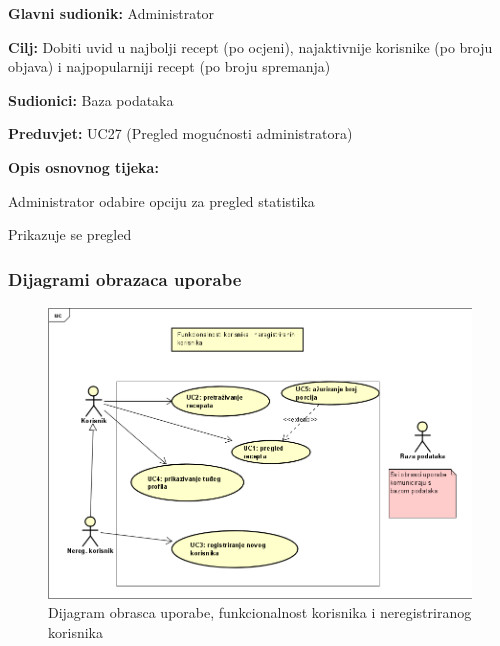 					\noindent {}
					\begin{packed_item}
						
						\item \textbf{Glavni sudionik: }Administrator
						\item \textbf{Cilj: }Dobiti uvid u najbolji recept (po ocjeni), najaktivnije korisnike (po broju objava) i najpopularniji recept (po broju spremanja)
						\item \textbf{Sudionici: }Baza podataka
						\item \textbf{Preduvjet: }UC27 (Pregled mogućnosti administratora)
						\item \textbf{Opis osnovnog tijeka:}
						
						\item[] \begin{packed_enum}
							\item Administrator odabire opciju za pregled statistika
							\item Prikazuje se pregled
						\end{packed_enum}
					\end{packed_item}
				
					
				\subsubsection{Dijagrami obrazaca uporabe}
					
					\begin{figure}[H]
						\includegraphics[scale=1]{slike/UC_nereg.png} %
						\centering
						\caption{Dijagram obrasca uporabe, funkcionalnost korisnika i neregistriranog korisnika}
						\label{fig:UC_diagram1}
					\end{figure}


